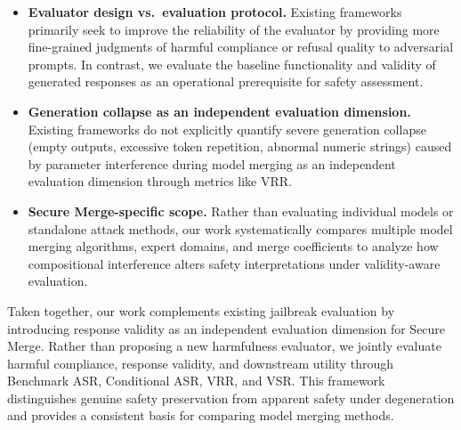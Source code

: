 \begin{itemize}
    \item \textbf{Evaluator design vs.\ evaluation protocol.}
    Existing frameworks primarily seek to improve the reliability of the evaluator by providing more fine-grained judgments of harmful compliance or refusal quality to adversarial prompts. In contrast, we evaluate the baseline functionality and validity of generated responses as an operational prerequisite for safety assessment.

    \item \textbf{Generation collapse as an independent evaluation dimension.}
    Existing frameworks do not explicitly quantify severe generation collapse (empty outputs, excessive token repetition, abnormal numeric strings) caused by parameter interference during model merging as an independent evaluation dimension through metrics like VRR.

    \item \textbf{Secure Merge-specific scope.}
    Rather than evaluating individual models or standalone attack methods, our work systematically compares multiple model merging algorithms, expert domains, and merge coefficients to analyze how compositional interference alters safety interpretations under validity-aware evaluation.
\end{itemize}


Taken together, our work complements existing jailbreak evaluation by introducing response validity as an independent evaluation dimension for Secure Merge. Rather than proposing a new harmfulness evaluator, we jointly evaluate harmful compliance, response validity, and downstream utility through Benchmark ASR, Conditional ASR, VRR, and VSR. This framework distinguishes genuine safety preservation from apparent safety under degeneration and provides a consistent basis for comparing model merging methods.




